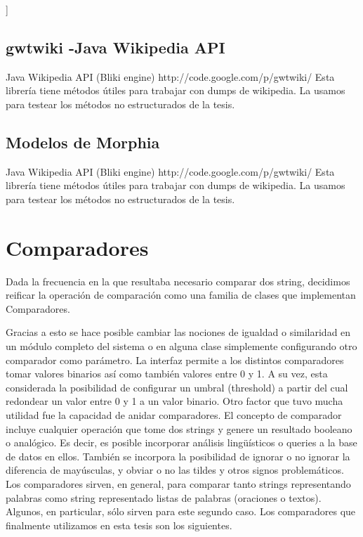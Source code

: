 \bigskip
[[Dar ejemplos de una query]]
\bigskip

\section{gwtwiki -Java Wikipedia API}\label{sec:gwtwiki}

Java Wikipedia API (Bliki engine)
http://code.google.com/p/gwtwiki/
Esta librería tiene métodos útiles para trabajar con dumps de wikipedia. La usamos para testear los métodos no estructurados de la tesis.


\section{Modelos de Morphia}\label{sec:modelos-morphia}

Java Wikipedia API (Bliki engine)
http://code.google.com/p/gwtwiki/
Esta librería tiene métodos útiles para trabajar con dumps de wikipedia. La usamos para testear los métodos no estructurados de la tesis.


\chapter{Comparadores}
\label{sec:comparadores}

Dada la frecuencia en la que resultaba necesario comparar dos string,
decidimos reificar la operación de comparación como una familia de
clases que implementan Comparadores. 


Gracias a esto se hace posible cambiar las nociones de igualdad o
similaridad en un módulo completo del sistema o en alguna clase
simplemente configurando otro comparador como parámetro. La
interfaz permite a los distintos comparadores tomar valores binarios
así como también valores entre 0 y 1. A su vez, esta considerada la
posibilidad de configurar un umbral (threshold) a partir del cual
redondear un valor entre 0 y 1 a un valor binario. Otro factor que tuvo
mucha utilidad fue la capacidad de anidar comparadores. 
El concepto de comparador incluye cualquier operación que tome dos
strings y genere un resultado booleano o analógico. Es decir, es posible 
incorporar análisis lingüísticos o queries a la base de datos en ellos.
También se incorpora la posibilidad de ignorar o no ignorar la diferencia de mayúsculas, 
y obviar o no las tildes y otros signos problemáticos. Los comparadores sirven,
en general, para comparar tanto strings representando palabras como
string representado listas de palabras (oraciones o textos). Algunos,
en particular, sólo sirven para este segundo caso. Los comparadores
que finalmente utilizamos en esta tesis son los siguientes.

